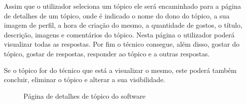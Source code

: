 Assim que o utilizador seleciona um tópico ele será encaminhado para a página de detalhes de um tópico, onde 
é indicado o nome do dono do tópico, a sua imagem de perfil, a hora de criação do mesmo, a quantidade de 
gostos, o título, descrição, imagens e comentários do tópico. Nesta página o utilizador poderá visualizar 
todas as respostas. 
Por fim o técnico consegue, além disso, gostar do tópico, gostar de respostas, responder ao tópico e a outras respostas.

Se o tópico for do técnico que está a visualizar o mesmo, este poderá também concluir, eliminar o tópico e alterar 
a sua visibilidade.

\begin{figure}[htb]%
    \centering
    \qquad
    \caption{Página de detalhes de tópico do software}%
    \label{fig:27}%
\end{figure}

